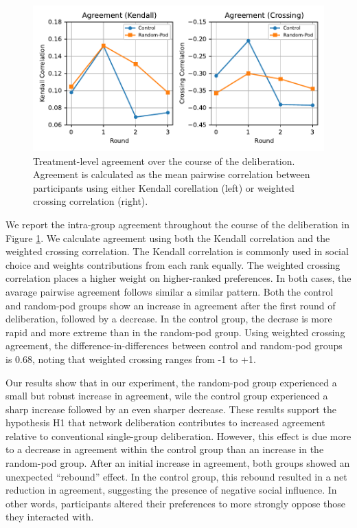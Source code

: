 {\begin{figure}
    \centering
    \includegraphics[width=6in]{chapters/figures/NetDelibExp/fig-agreement-fillattr.pdf}
    \caption{Treatment-level agreement over the course of the deliberation. Agreement is calculated as the mean pairwise correlation between participants using either Kendall corellation (left) or weighted crossing correlation (right).}
    \label{fig:agreement}
\end{figure}

We report the intra-group agreement throughout the course of the deliberation in Figure \ref{fig:agreement}.
We calculate agreement using both the Kendall correlation
and the weighted crossing correlation.
The Kendall correlation is commonly used in social choice and weights contributions from each rank equally.
The weighted crossing correlation places a higher weight on
higher-ranked preferences.
In both cases, the avarage pairwise agreement follows similar a similar pattern.
Both the control and random-pod groups show an increase in agreement after the first round of deliberation,
followed by a decrease.
In the control group, the decrase is more rapid and more extreme than in the random-pod group.
Using weighted crossing agreement, the difference-in-differences between control and random-pod groups is 0.68, noting that weighted crossing ranges from -1 to +1.

Our results show that in our experiment, the random-pod group 
experienced a small but robust increase in agreement,
wile the control group experienced a sharp increase followed by an even sharper decrease.
These results support the hypothesis H1 that network deliberation contributes to increased agreement relative to conventional single-group deliberation.
However, this effect is due more to a decrease in agreement
within the control group than an increase in the random-pod group.
After an initial increase in agreement, both groups showed an unexpected ``rebound'' effect.
In the control group, this rebound resulted in a net reduction in agreement, suggesting the presence of negative social influence.
In other words, participants altered their preferences to more strongly oppose those they interacted with.

}
